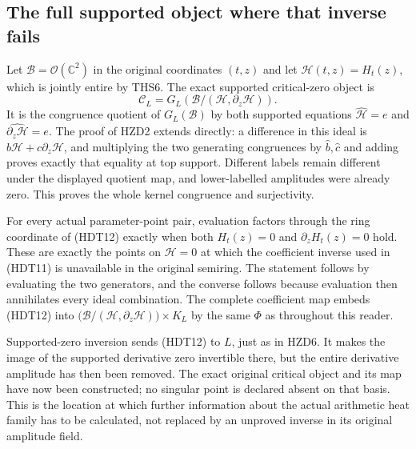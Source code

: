 \subsection{The full supported object where that inverse fails}

Let $\mathcal B=\mathcal O(\mathbb C^2)$ in the original
coordinates $(t,z)$ and let $\mathcal H(t,z)=H_t(z)$, which
is jointly entire by THS6. The exact supported critical-zero
object is
\begin{equation}\tag{HDT12}
 \mathscr C_L=
 G_L\left(\mathcal B/(\mathcal H,\partial_z\mathcal H)\right).
\end{equation}
It is the congruence quotient of $G_L(\mathcal B)$ by both
supported equations
$\widehat{\mathcal H}=e$ and
$\widehat{\partial_z\mathcal H}=e$.
The proof of HZD2 extends directly: a difference in this ideal
is $b\mathcal H+c\partial_z\mathcal H$, and multiplying the
two generating congruences by $\widehat b,\widehat c$ and
adding proves exactly that equality at top support. Different
labels remain different under the displayed quotient map, and
lower-labelled amplitudes were already zero. This proves the
whole kernel congruence and surjectivity.

For every actual parameter-point pair, evaluation factors
through the ring coordinate of (HDT12) exactly when both
$H_t(z)=0$ and $\partial_zH_t(z)=0$ hold. These are exactly
the points on $\mathcal H=0$ at which the coefficient inverse used in (HDT11)
is unavailable in the original semiring. The statement follows
by evaluating the two generators, and the converse follows
because evaluation then annihilates every ideal combination.
The complete coefficient map embeds (HDT12) into
$\bigl(\mathcal B/(\mathcal H,\partial_z\mathcal H)\bigr)
\times K_L$ by the same $\Phi$ as throughout this reader.

Supported-zero inversion sends (HDT12) to $L$, just as in
HZD6. It makes the image of the supported derivative zero
invertible there, but the entire derivative amplitude has
then been removed. The exact original critical object and
its map have now been constructed; no singular point is
declared absent on that basis. This is the location at which
further information about the actual arithmetic heat family
has to be calculated, not replaced by an unproved inverse
in its original amplitude field.

